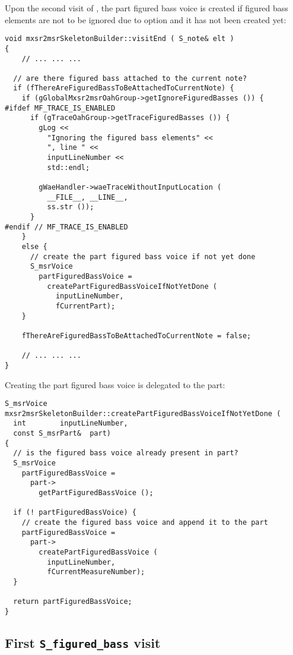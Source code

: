 Upon the second visit of , the part figured bass voice is created if figured bass elements are not to be ignored due to option  and it has not been created yet:
\begin{lstlisting}[language=CPlusPlus]
void mxsr2msrSkeletonBuilder::visitEnd ( S_note& elt )
{
	// ... ... ...

  // are there figured bass attached to the current note?
  if (fThereAreFiguredBassToBeAttachedToCurrentNote) {
    if (gGlobalMxsr2msrOahGroup->getIgnoreFiguredBasses ()) {
#ifdef MF_TRACE_IS_ENABLED
      if (gTraceOahGroup->getTraceFiguredBasses ()) {
        gLog <<
          "Ignoring the figured bass elements" <<
          ", line " <<
          inputLineNumber <<
          std::endl;

        gWaeHandler->waeTraceWithoutInputLocation (
          __FILE__, __LINE__,
          ss.str ());
      }
#endif // MF_TRACE_IS_ENABLED
    }
    else {
      // create the part figured bass voice if not yet done
      S_msrVoice
        partFiguredBassVoice =
          createPartFiguredBassVoiceIfNotYetDone (
            inputLineNumber,
            fCurrentPart);
    }

    fThereAreFiguredBassToBeAttachedToCurrentNote = false;

	// ... ... ...
}
\end{lstlisting}

Creating the part figured bass voice is delegated to the part:
\begin{lstlisting}[language=CPlusPlus]
S_msrVoice mxsr2msrSkeletonBuilder::createPartFiguredBassVoiceIfNotYetDone (
  int        inputLineNumber,
  const S_msrPart&  part)
{
  // is the figured bass voice already present in part?
  S_msrVoice
    partFiguredBassVoice =
      part->
        getPartFiguredBassVoice ();

  if (! partFiguredBassVoice) {
    // create the figured bass voice and append it to the part
    partFiguredBassVoice =
      part->
        createPartFiguredBassVoice (
          inputLineNumber,
          fCurrentMeasureNumber);
  }

  return partFiguredBassVoice;
}
\end{lstlisting}


\subsection{First {\tt S_figured_bass} visit}

